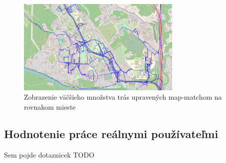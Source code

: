 \begin{figure}[H]
  \centering
  \includegraphics[width=0.7\textwidth]{img/map-match rozdiel/po map-match.png}
  \caption{Zobrazenie väčšieho množstva trás upravených map-matchom na rovnakom mieste}
  \label{fig:niespagety}
\end{figure}

\subsection{Hodnotenie práce reálnymi používateľmi}
Sem pojde dotaznicek TODO

